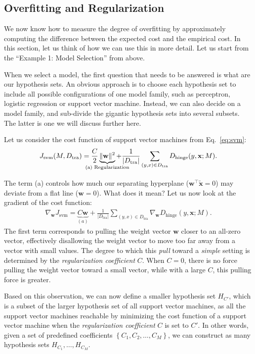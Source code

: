 \documentclass{report}
\newcommand{\vect}[1]{\mathbf{#1}}
\newcommand{\vx}[0]{\vect{x}}
\newcommand{\vw}[0]{\vect{w}}
\newcommand{\hinge}{\text{hinge}}
\newcommand{\tra}{\text{tra}}
\begin{document}
\subsection{Overfitting and Regularization}
\label{sec:regularization}

We now know how to measure the degree of overfitting by approximately computing
the difference between the expected cost and the empirical cost. In this
section, let us think of how we can use this in more detail.  Let us start from
the ``Example 1: Model Selection'' from above. 

When we select a model, the first question that needs to be answered is what are
our hypothesis sets. An obvious approach is to choose each hypothesis set to
include all possible configurations of one model family, such as perceptron,
logistic regression or support vector machine. Instead, we can also decide on a
model family, and sub-divide the gigantic hypothesis sets into several subsets.
The latter is one we will discuss further here.

Let us consider the cost function of support vector machines from
Eq.~\eqref{eq:svm}: 
\begin{align*}
    J_{\text{svm}}(M,D_{\tra}) = \frac{C}{2}
    \underbrace{\|\vw\|^2}_{\mathclap{\text{(a) Regularization}}} + 
    \frac{1}{|D_{\tra}|} \sum_{(y,x)
    \in D_{\tra}} D_{\hinge}(y, \vx; M).
\end{align*}

The term (a) controls how much our separating hyperplane ($\vw^\top
\tilde{\vx}=0$) may deviate from a flat line ($\vw = 0$). What does it mean? Let
us now look at the gradient of the cost function:
\begin{align*}
    \nabla_{\vw} J_{\text{svm}} = 
    \underbrace{
    C \vw 
}_{(a)}
    + 
    \frac{1}{|D_{\tra}|} \sum_{(y,x)
    \in D_{\tra}} \nabla_{\vw} D_{\hinge}(y, \vx; M).
\end{align*}
The first term corresponds to pulling the weight vector $\vw$ closer to an
all-zero vector, effectively disallowing the weight vector to move too far away
from a vector with small values. The degree to which this {\it pull} toward a
{\it simple} setting is determined by the {\it regularization coefficient} $C$.
When $C=0$, there is no force pulling the weight vector toward a small vector,
while with a large $C$, this pulling force is greater. 

Based on this observation, we can now define a smaller hypothesis set $H_{C'}$,
which is a subset of the larger hypothesis set of all support vector machines,
as all the support vector machines reachable by minimizing the cost function of
a support vector machine when the {\it regularization coefficient} $C$ is set to
$C'$. In other words, given a set of predefined coefficients $\left\{ C_1, C_2,
\ldots, C_M\right\}$, we can construct as many hypothesis sets $H_{C_1}, \ldots,
H_{C_M}$. 
\end{document}
